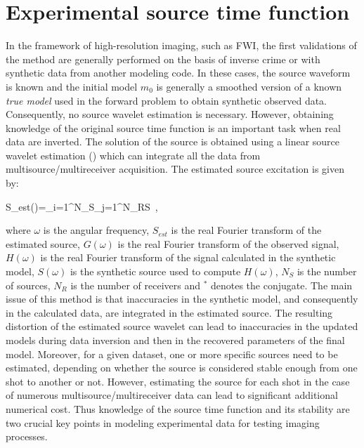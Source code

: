 \documentclass[extra,mreferee]{gji}
\newenvironment{orangenote}{\par\color{Orange}}{\par}
\begin{document}

\begin{orangenote}
\section{Experimental source time function}

In the framework of high-resolution imaging, such as FWI, the first validations of the method are generally performed on the basis of inverse crime or with synthetic data from another modeling code. In these cases, the source waveform is known and the initial model $m_{0}$ is generally a smoothed version of a known \textit{true model} used in the forward problem to obtain synthetic observed data. Consequently, no source wavelet estimation is necessary. However, obtaining knowledge of the original source time function is an important task when real data are inverted. The solution of the source is obtained using a linear source wavelet estimation (\cite{Pratt_FWI_1999,Virieux_FWI_2009}) which can integrate all the data from multisource/multireceiver acquisition. The estimated source excitation is given by:

\equation
S_{est}(\omega)=\sum\limits_{i=1}^{N_{S}}\sum\limits_{j=1}^{N_{R}}S\ ,
\label{eq:lswe}
\endequation

where $\omega$ is the angular frequency, $S_{est}$ is the real Fourier transform of the estimated source, $G(\omega)$ is the real Fourier transform of the observed signal, $H(\omega)$ is the real Fourier transform of the signal calculated in the synthetic model, $S(\omega)$ is the synthetic source used to compute $H(\omega)$, $N_{S}$ is the number of sources, $N_{R}$ is the number of receivers and $^{*}$ denotes the conjugate. The main issue of this method is that inaccuracies in the synthetic model, and consequently in the calculated data, are integrated in the estimated source. The resulting distortion of the estimated source wavelet can lead to inaccuracies in the updated models during data inversion and then in the recovered parameters of the final model. Moreover, for a given dataset, one or more specific sources need to be estimated, depending on whether the source is considered stable enough from one shot to another or not. However, estimating the source for each shot in the case of numerous multisource/multireceiver data can lead to significant additional numerical cost. Thus knowledge of the source time function and its stability are two crucial key points in modeling experimental data for testing imaging processes.


\end{orangenote}
\end{document}
